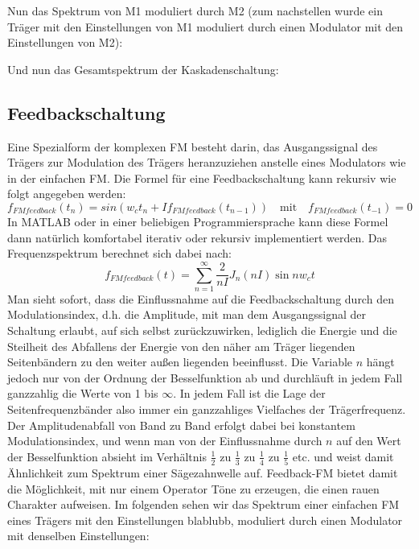 Nun das Spektrum von M1 moduliert durch M2 (zum nachstellen wurde ein Träger mit den Einstellungen von M1 moduliert durch einen Modulator mit den Einstellungen von M2):

Und nun das Gesamtspektrum der Kaskadenschaltung:

\subsection{Feedbackschaltung}

Eine Spezialform der komplexen FM besteht darin, das Ausgangssignal des Trägers zur Modulation des Trägers heranzuziehen anstelle eines Modulators wie in der einfachen FM. Die Formel für eine Feedbackschaltung kann rekursiv wie folgt angegeben werden:
\begin{equation}
f_{FMfeedback}(t_{n}) = sin(w_{c}t_{n} + If_{FMfeedback}(t_{n-1})) \quad \text{mit} \quad f_{FMfeedback}(t_{-1}) = 0
\end{equation}
In MATLAB oder in einer beliebigen Programmiersprache kann diese Formel dann natürlich komfortabel iterativ oder rekursiv implementiert werden.
Das Frequenzspektrum berechnet sich dabei nach:
\begin{equation}
f_{FMfeedback}(t) = \sum_{n=1}^{\infty}\frac{2}{nI}J_n(nI)\sin{nw_{c}t}
\end{equation}
Man sieht sofort, dass die Einflussnahme auf die Feedbackschaltung durch den Modulationsindex, d.h. die Amplitude, mit man dem Ausgangssignal der Schaltung erlaubt, auf sich selbst zurückzuwirken, lediglich die Energie und die Steilheit des Abfallens der Energie von den näher am Träger liegenden Seitenbändern zu den weiter außen liegenden beeinflusst. Die Variable $n$ hängt jedoch nur von der Ordnung der Besselfunktion ab und durchläuft in jedem Fall ganzzahlig die Werte von 1 bis $\infty$. In jedem Fall ist die Lage der Seitenfrequenzbänder also immer ein ganzzahliges Vielfaches der Trägerfrequenz. Der Amplitudenabfall von Band zu Band erfolgt dabei bei konstantem Modulationsindex, und wenn man von der Einflussnahme durch $n$ auf den Wert der Besselfunktion absieht im Verhältnis $\frac{1}{2}$ zu $\frac{1}{3}$ zu $\frac{1}{4}$ zu $\frac{1}{5}$ etc. und weist damit Ähnlichkeit zum Spektrum einer Sägezahnwelle auf. Feedback-FM bietet damit die Möglichkeit, mit nur einem Operator Töne zu erzeugen, die einen rauen Charakter aufweisen. Im folgenden sehen wir das Spektrum einer einfachen FM eines Trägers mit den Einstellungen blablubb, moduliert durch einen Modulator mit denselben Einstellungen:

